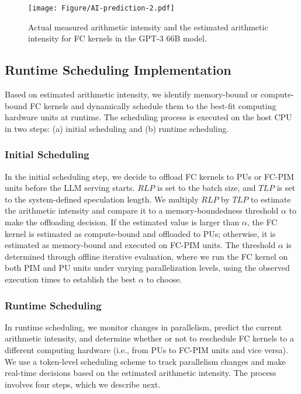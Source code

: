 \begin{figure}[h]

\texttt{[image: Figure/AI-prediction-2.pdf]}
\caption{Actual measured arithmetic intensity and the estimated arithmetic intensity for FC kernels in the GPT-3 66B model.}
\label{fig:AI-prediction}

\end{figure}


\subsection{Runtime Scheduling Implementation}
Based on estimated arithmetic intensity, we identify memory-bound or compute-bound FC kernels and dynamically schedule them to the best-fit computing hardware units at runtime.
The scheduling process is executed on the host CPU in two steps: (a) initial scheduling and (b) runtime scheduling.

\subsubsection{Initial Scheduling}
In the initial scheduling step, we decide to offload FC kernels to PUs or FC-PIM units before the LLM serving starts. $RLP$ is set to the batch size, and $TLP$ is set to the system-defined speculation length. We multiply $RLP$ by $TLP$ to estimate the arithmetic intensity and compare it to a memory-boundedness threshold $\alpha$ to make the offloading decision. If the estimated value is larger than $\alpha$, the FC kernel is estimated as compute-bound and offloaded to PUs; otherwise, it is estimated as memory-bound and executed on FC-PIM units. The threshold $\alpha$ is determined through offline iterative evaluation, where we run the FC kernel on both PIM and PU units under varying parallelization levels, using the observed execution times to establish the best $\alpha$ to choose.


\subsubsection{Runtime Scheduling}
In runtime scheduling, we monitor changes in parallelism, predict the current arithmetic intensity, and determine whether or not to reschedule FC kernels to a different computing hardware (i.e., from PUs to FC-PIM units and vice versa). We use a token-level scheduling scheme to track parallelism changes and make real-time decisions based on the estimated arithmetic intensity. The process involves four steps, which we describe next.


